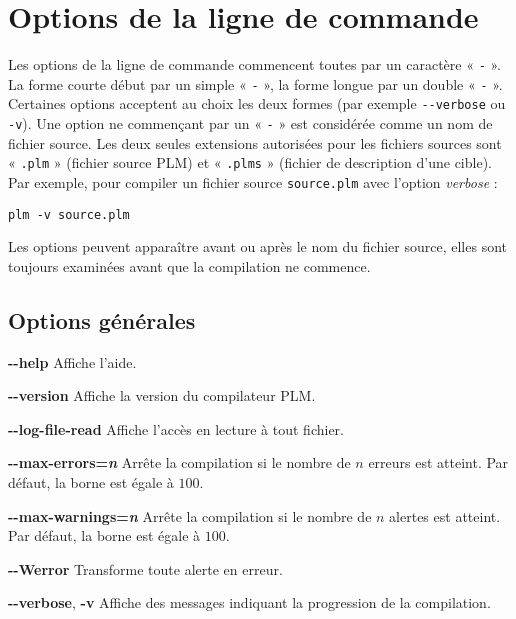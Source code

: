 




\chapter{Options de la ligne de commande}

Les options de la ligne de commande commencent toutes par un caractère « \texttt{-} ». La forme courte début par un simple « \texttt{-} », la forme longue par un double « \texttt{-} ». Certaines options acceptent au choix les deux formes (par exemple \texttt{-{}-verbose} ou \texttt{-v}). Une option ne commençant par un « \texttt{-} » est considérée comme un nom de fichier source. Les deux seules extensions autorisées pour les fichiers sources sont « \texttt{.plm} » (fichier source PLM) et  « \texttt{.plms} » (fichier de description d'une cible). Par exemple, pour compiler un fichier source \texttt{source.plm} avec l'option \emph{verbose} :

\texttt{plm -v source.plm}

Les options peuvent apparaître avant ou après le nom du fichier source, elles sont toujours examinées avant que la compilation ne commence.


\section{Options générales}

{\ttfamily\bfseries-{}-help} Affiche l'aide.


{\ttfamily\bfseries-{}-version} Affiche la version du compilateur PLM.



{\ttfamily\bfseries-{}-log-file-read} Affiche l'accès en lecture à tout fichier.

{\ttfamily\bfseries-{}-max-errors=\emph{n}} Arrête la compilation si le nombre de $n$ erreurs est atteint. Par défaut, la borne est égale à $100$.

{\ttfamily\bfseries-{}-max-warnings=\emph{n}} Arrête la compilation si le nombre de $n$ alertes est atteint. Par défaut, la borne est égale à $100$.

{\ttfamily\bfseries-{}-Werror} Transforme toute alerte en erreur.

{\ttfamily\bfseries-{}-verbose}, {\ttfamily\bfseries-v} Affiche des messages indiquant la progression de la compilation.








